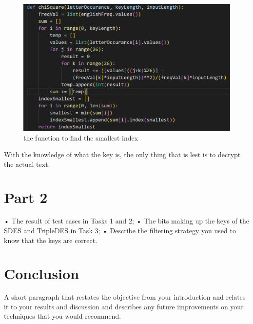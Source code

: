\documentclass[12pt, letterpaper]{article}
\begin{document}
\begin{figure}
  \includegraphics[width=\linewidth]{code_snippets/chiSquare.PNG}
  \caption{the function to find the smallest index}
  \label{fig:chiSquare}
\end{figure}

With the knowledge of what the key is, the only thing that is lest is to decrypt the actual text. 

\section*{Part 2}
• The result of test cases in Tasks 1 and 2; 
• The bits making up the keys of the SDES and TripleDES in Task 3; 
• Describe the filtering strategy you used to know that the keys are correct. 

\section*{Conclusion}
A short paragraph that restates the objective from your introduction and relates it to your results and discussion and describes any future improvements on your techniques that you would recommend. 
\end{document}
